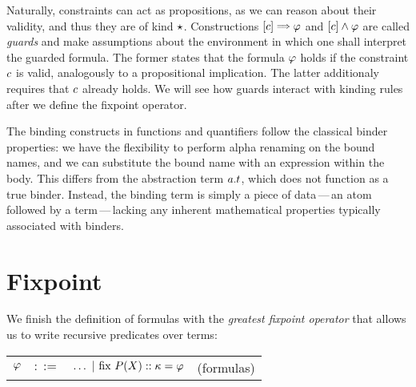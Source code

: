 \documentclass[english, mgr]{iithesis}
\renewcommand{\it}[1]{\textit{#1}}
\newcommand{\fix}[3]{\ensuremath{\text{fix }#1(#2)\ofkind#3=}}\newcommand{\myatop}[2]{\ensuremath{\genfrac{}{}{0pt}{}{#1\hfill}{#2\hfill}}}
\newcommand{\mdash}{\,---\,}
\def\-{{\mdash}}
\begin{document}
Naturally, constraints can act as propositions, as we can reason about their
validity, and thus they are of kind $\star$.
Constructions $\fCImp{\constr} \formphi$ and $[c]\wedge \varphi$
are called \it{guards} and make assumptions about the environment in which
one shall interpret the guarded formula.
The former states that the formula $\varphi$ holds if the constraint $c$ is valid,
analogously to a propositional implication.
The latter additionaly requires that $c$ already holds.
We will see how guards interact with kinding rules after we define the fixpoint operator.

The binding constructs in functions and quantifiers follow the classical binder properties: we have the flexibility to perform alpha renaming on the bound names, and we can substitute the bound name with an expression within the body.
This differs from the abstraction term $a.t$, which
does not function as a true binder.
Instead, the binding term is simply a piece of data\-an atom followed by a term\-lacking any inherent mathematical properties typically associated with binders.

\section{Fixpoint}
We finish the definition of formulas with the \it{greatest fixpoint operator}
that allows us to write recursive predicates over terms:
\\
\begin{tabular}{rrlr}
$\varphi$ & $::=$ & $\ldots
               \bnfor \fix{\propv}{\termv}{\kind}{\formphi} $
    & (formulas)
\end{tabular}
\end{document}
